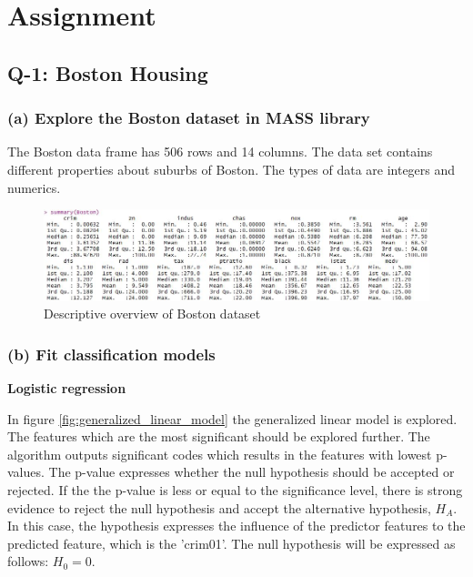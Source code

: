 \section{Assignment}

\subsection{Q-1: Boston Housing}

\subsubsection*{(a) Explore the Boston dataset in MASS library}
The Boston data frame has 506 rows and 14 columns. The data set contains different properties about suburbs of Boston. The types of data are integers and numerics. 


\begin{figure}[H]
\centering
\includegraphics[scale=0.49]{Graphics/Assignment1/ExploreBoston.JPG}
\caption{Descriptive overview of Boston dataset}
\label{fig:logistic_regression_confusions_matrix_001}
\end{figure}


\subsubsection*{(b) Fit classification models}
\textbf{Logistic regression}

In figure \ref{fig:generalized_linear_model} the generalized linear model is explored. The features which are the most significant should be explored further. The algorithm outputs significant codes which results in the features with lowest p-values. The p-value expresses whether the null hypothesis should be accepted or rejected. If the the p-value is less or equal to the significance level, there is strong evidence to reject the null hypothesis and accept the alternative hypothesis, $H_A$.   
In this case, the hypothesis expresses the influence of the predictor features to the predicted feature, which is the 'crim01'. The null hypothesis will be expressed as follows: $H_0 = 0$. 

